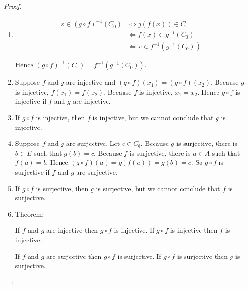 \begin{proof}
    \begin{enumerate}[label={(\alph*)}]
        \item \begin{align*}
                  x\in {(g\circ f)}^{-1}(C_{0}) & \Longleftrightarrow g(f(x))\in C_{0}            \\
                                                & \Longleftrightarrow f(x)\in g^{-1}(C_{0})       \\
                                                & \Longleftrightarrow x\in f^{-1}(g^{-1}(C_{0})).
              \end{align*}

              Hence ${(g\circ f)}^{-1}(C_{0}) = f^{-1}(g^{-1}(C_{0}))$.
        \item Suppose $f$ and $g$ are injective and $(g\circ f)(x_{1}) = (g\circ f)(x_{2})$. Because $g$ is injective, $f(x_{1}) = f(x_{2})$. Because $f$ is injective, $x_{1} = x_{2}$. Hence $g\circ f$ is injective if $f$ and $g$ are injective.
        \item If $g\circ f$ is injective, then $f$ is injective, but we cannot conclude that $g$ is injective.
        \item Suppose $f$ and $g$ are surjective. Let $c\in C_{0}$. Because $g$ is surjective, there is $b\in B$ such that $g(b) = c$. Because $f$ is surjective, there is $a\in A$ such that $f(a) = b$. Hence $(g\circ f)(a) = g(f(a)) = g(b) = c$. So $g\circ f$ is surjective if $f$ and $g$ are surjective.
        \item If $g\circ f$ is surjective, then $g$ is surjective, but we cannot conclude that $f$ is surjective.
        \item Theorem:

              If $f$ and $g$ are injective then $g\circ f$ is injective. If $g\circ f$ is injective then $f$ is injective.

              If $f$ and $g$ are surjective then $g\circ f$ is surjective. If $g\circ f$ is surjective then $g$ is surjective.
    \end{enumerate}
\end{proof}


